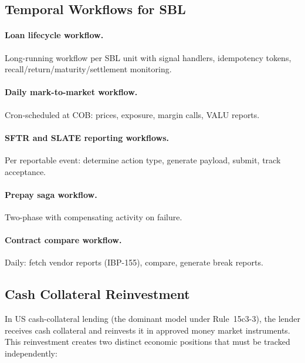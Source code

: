 \documentclass[11pt,a4paper]{article}
\begin{document}
\subsection{Temporal Workflows for SBL}
\label{sec:sbl-temporal}

\paragraph{Loan lifecycle workflow.} Long-running workflow per SBL unit with signal handlers, idempotency tokens, recall/return/maturity/settlement monitoring.

\paragraph{Daily mark-to-market workflow.} Cron-scheduled at COB: prices, exposure, margin calls, VALU reports.

\paragraph{SFTR and SLATE reporting workflows.} Per reportable event: determine action type, generate payload, submit, track acceptance.

\paragraph{Prepay saga workflow.} Two-phase with compensating activity on failure.

\paragraph{Contract compare workflow.} Daily: fetch vendor reports (IBP-155), compare, generate break reports.

\subsection{Cash Collateral Reinvestment}
\label{sec:sbl-reinvestment}

In US cash-collateral lending (the dominant model under Rule~15c3-3), the lender receives cash collateral and reinvests it in approved money market instruments. This reinvestment creates two distinct economic positions that must be tracked independently:
\end{document}
